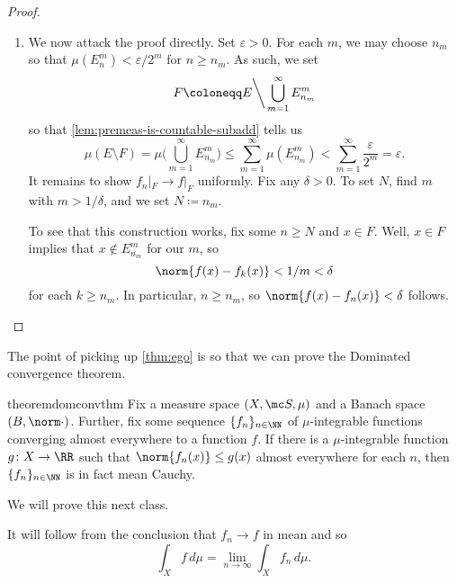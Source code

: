 \documentclass[../notes.tex]{subfiles}
\begin{document}
\begin{proof}
\begin{enumerate}
		\item We now attack the proof directly. Set $\varepsilon>0$. For each $m$, we may choose $n_m$ so that $\mu\left(E^m_{n}\right)<\varepsilon/2^m$ for $n\ge n_m$. As such, we set
		\[F\coloneqq E{\mathbin\bigg\backslash}\bigcup_{m=1}^\infty E^m_{n_m}\]
		so that \autoref{lem:premeas-is-countable-subadd} tells us
		\[\mu(E\setminus F)=\mu\Bigg(\bigcup_{m=1}^\infty E^m_{n_m}\Bigg)\le\sum_{m=1}^\infty\mu\left(E^m_{n_m}\right)<\sum_{m=1}^\infty\frac\varepsilon{2^m}=\varepsilon.\]
		It remains to show $f_n|_F\to f|_F$ uniformly. Fix any $\delta>0$. To set $N$, find $m$ with $m>1/\delta$, and we set $N\coloneqq n_{m}$.
		
		To see that this construction works, fix some $n\ge N$ and $x\in F$. Well, $x\in F$ implies that $x\notin E^m_{n_m}$ for our $m$, so
		\[\norm{f(x)-f_k(x)}<1/m<\delta\]
		for each $k\ge n_m$. In particular, $n\ge n_m$, so $\norm{f(x)-f_n(x)}<\delta$ follows.
		\qedhere
	\end{enumerate}
\end{proof}
The point of picking up \autoref{thm:ego} is so that we can prove the Dominated convergence theorem.
\begin{restatable}{theorem}{domconvthm} \label{thm:dom-conv}
	Fix a measure space $(X,\mc S,\mu)$ and a Banach space $(B,\norm\cdot)$. Further, fix some sequence $\{f_n\}_{n\in\NN}$ of $\mu$-integrable functions converging almost everywhere to a function $f$. If there is a $\mu$-integrable function $g\colon X\to\RR$ such that $\norm{f_n(x)}\le g(x)$ almost everywhere for each $n$, then $\{f_n\}_{n\in\NN}$ is in fact mean Cauchy.
\end{restatable}
\noindent We will prove this next class.
\begin{remark} \label{rem:apply-dom-conv}
	It will follow from the conclusion that $f_n\to f$ in mean and so
	\[\int_Xf\,d\mu=\lim_{n\to\infty}\int_Xf_n\,d\mu.\]
\end{remark}
\end{document}

